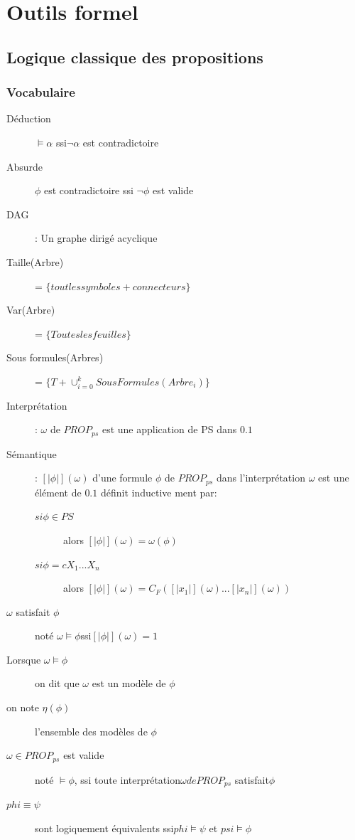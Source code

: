 \chapter{Outils formel}
\pagebreak

\section{Logique classique des propositions}
\subsection{Vocabulaire}

\begin{description}
\item[Déduction] $\models \alpha$ ssi$ \neg \alpha$ est contradictoire
\item[Absurde] $\phi$ est contradictoire ssi $\neg \phi$ est valide
\item[DAG]: Un graphe dirigé acyclique
\item[Taille(Arbre)] = $\{ tout les symboles + connecteurs \}$
\item[Var(Arbre)] = $\{ Toutes les feuilles \}$
\item[Sous formules(Arbres)] = $\{ T + \cup_{i=0}^k SousFormules(Arbre_i) \}$
\item[Interprétation]: $\omega$ de $PROP_{ps}$ est une application de PS dans ${0.1}$
\item[Sémantique]: $[| \phi |](\omega)$ d'une formule $\phi$ de $PROP_{ps}$ dans l'interprétation $\omega$ est une élément de ${0.1}$ définit inductive ment par:
\begin{description}
\item[$si \phi \in PS$] alors $[|\phi|](\omega) = \omega(\phi)$
\item[$si \phi = cX_1 ... X_n$] alors $[|\phi|](\omega) = C_F([|x_1|](\omega) ... [|x_n|](\omega))$
\end{description}
\item[$\omega $ satisfait $ \phi$] noté $\omega \models \phi $ssi$ [|\phi|](\omega) = 1$
\item[Lorsque $\omega \models \phi$] on dit que $\omega$ est un modèle de $\phi$
\item[on note $\eta(\phi)$] l'ensemble des modèles de $\phi$
\item[$\omega \in PROP_{ps}$ est valide] noté $\models \phi$, ssi toute interprétation$ \omega de PROP_{ps}$ satisfait$ \phi$
\item[$phi \equiv \psi$] sont logiquement équivalents ssi$ phi \models \psi$ et $psi \models \phi$
\end{description}

